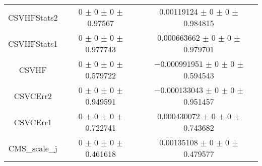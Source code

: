 \begin{table}
\begin{tabular}{ccc}
CSVHFStats2 & \num{0} $\pm$ \num{0} $\pm$ \num{0} $\pm$ \num{0.97567} & \num{0.00119124} $\pm$ \num{0} $\pm$ \num{0} $\pm$ \num{0.984815}\\
CSVHFStats1 & \num{0} $\pm$ \num{0} $\pm$ \num{0} $\pm$ \num{0.977743} & \num{0.000663662} $\pm$ \num{0} $\pm$ \num{0} $\pm$ \num{0.979701}\\
CSVHF & \num{0} $\pm$ \num{0} $\pm$ \num{0} $\pm$ \num{0.579722} & \num{-0.000991951} $\pm$ \num{0} $\pm$ \num{0} $\pm$ \num{0.594543}\\
CSVCErr2 & \num{0} $\pm$ \num{0} $\pm$ \num{0} $\pm$ \num{0.949591} & \num{-0.000133043} $\pm$ \num{0} $\pm$ \num{0} $\pm$ \num{0.951457}\\
CSVCErr1 & \num{0} $\pm$ \num{0} $\pm$ \num{0} $\pm$ \num{0.722741} & \num{0.000430072} $\pm$ \num{0} $\pm$ \num{0} $\pm$ \num{0.743682}\\
CMS\_scale\_j & \num{0} $\pm$ \num{0} $\pm$ \num{0} $\pm$ \num{0.461618} & \num{0.00135108} $\pm$ \num{0} $\pm$ \num{0} $\pm$ \num{0.479577}\\
\bottomrule
\end{tabular}
\end{table}